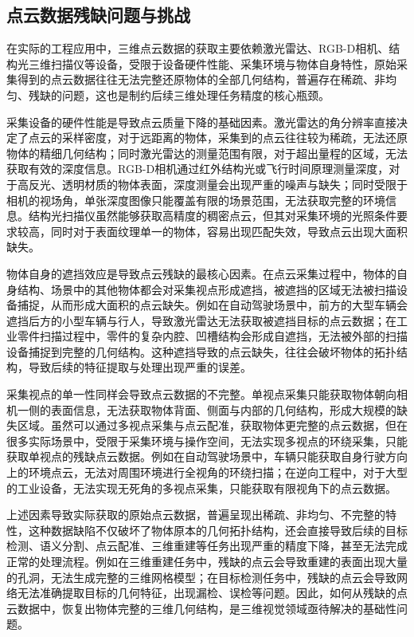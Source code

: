 \subsection{点云数据残缺问题与挑战}
在实际的工程应用中，三维点云数据的获取主要依赖激光雷达、RGB-D相机、结构光三维扫描仪等设备，受限于设备硬件性能、采集环境与物体自身特性，原始采集得到的点云数据往往无法完整还原物体的全部几何结构，普遍存在稀疏、非均匀、残缺的问题\cite{yu2021pointr}，这也是制约后续三维处理任务精度的核心瓶颈。

采集设备的硬件性能是导致点云质量下降的基础因素。激光雷达的角分辨率直接决定了点云的采样密度，对于远距离的物体，采集到的点云往往较为稀疏，无法还原物体的精细几何结构；同时激光雷达的测量范围有限，对于超出量程的区域，无法获取有效的深度信息。RGB-D相机通过红外结构光或飞行时间原理测量深度，对于高反光、透明材质的物体表面，深度测量会出现严重的噪声与缺失；同时受限于相机的视场角，单张深度图像只能覆盖有限的场景范围，无法获取完整的环境信息。结构光扫描仪虽然能够获取高精度的稠密点云，但其对采集环境的光照条件要求较高，同时对于表面纹理单一的物体，容易出现匹配失效，导致点云出现大面积缺失。

物体自身的遮挡效应是导致点云残缺的最核心因素。在点云采集过程中，物体的自身结构、场景中的其他物体都会对采集视点形成遮挡，被遮挡的区域无法被扫描设备捕捉，从而形成大面积的点云缺失\cite{yu2021pointr}。例如在自动驾驶场景中，前方的大型车辆会遮挡后方的小型车辆与行人，导致激光雷达无法获取被遮挡目标的点云数据；在工业零件扫描过程中，零件的复杂内腔、凹槽结构会形成自遮挡，无法被外部的扫描设备捕捉到完整的几何结构。这种遮挡导致的点云缺失，往往会破坏物体的拓扑结构，导致后续的特征提取与处理出现严重的误差。

采集视点的单一性同样会导致点云数据的不完整。单视点采集只能获取物体朝向相机一侧的表面信息，无法获取物体背面、侧面与内部的几何结构，形成大规模的缺失区域。虽然可以通过多视点采集与点云配准，获取物体更完整的点云数据，但在很多实际场景中，受限于采集环境与操作空间，无法实现多视点的环绕采集，只能获取单视点的残缺点云数据。例如在自动驾驶场景中，车辆只能获取自身行驶方向上的环境点云，无法对周围环境进行全视角的环绕扫描；在逆向工程中，对于大型的工业设备，无法实现无死角的多视点采集，只能获取有限视角下的点云数据。

上述因素导致实际获取的原始点云数据，普遍呈现出稀疏、非均匀、不完整的特性，这种数据缺陷不仅破坏了物体原本的几何拓扑结构，还会直接导致后续的目标检测、语义分割、点云配准、三维重建等任务出现严重的精度下降，甚至无法完成正常的处理流程\cite{yan2022shapeformer}。例如在三维重建任务中，残缺的点云会导致重建的表面出现大量的孔洞，无法生成完整的三维网格模型；在目标检测任务中，残缺的点云会导致网络无法准确提取目标的几何特征，出现漏检、误检等问题。因此，如何从残缺的点云数据中，恢复出物体完整的三维几何结构，是三维视觉领域亟待解决的基础性问题。

